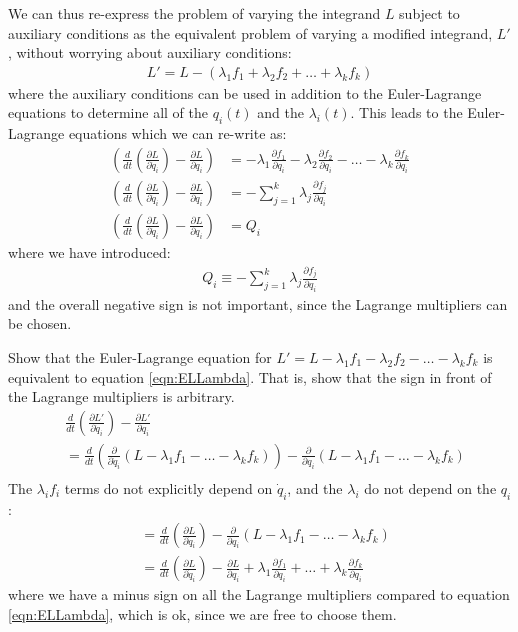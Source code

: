 We can thus re-express the problem of varying the integrand $L$ subject to auxiliary conditions as the equivalent problem of varying a modified integrand, $L'$, without worrying about auxiliary conditions:
\begin{align}
L'=L-(\lambda_1f_1+\lambda_2f_2+\dots +\lambda_kf_k)
\end{align}
where the auxiliary conditions can be used in addition to the Euler-Lagrange equations to determine all of the $q_i(t)$ and the $\lambda_i(t)$. This leads to the Euler-Lagrange equations which we can re-write as:
\begin{align}
\left(\frac{d}{dt}\left(\frac{\partial L}{\partial \dot{q}_i}\right)-\frac{\partial L}{\partial q_i}\right) &=-\lambda_1 \frac{\partial f_1}{\partial q_i}-\lambda_2\frac{\partial f_2}{\partial q_i} -\dots -\lambda_k \frac{\partial f_k}{\partial q_i}\nonumber\\
\left(\frac{d}{dt}\left(\frac{\partial L}{\partial \dot{q}_i}\right)-\frac{\partial L}{\partial q_i}\right) &=-\sum_{j=1}^k\lambda_j \frac{\partial f_j}{\partial q_i}\nonumber\\
\left(\frac{d}{dt}\left(\frac{\partial L}{\partial \dot{q}_i}\right)-\frac{\partial L}{\partial q_i}\right) &=Q_i
\label{eqn:ELLambdaQ}
\end{align}
where we have introduced:
\begin{align}
Q_i\equiv -\sum_{j=1}^k\lambda_j \frac{\partial f_j}{\partial q_i}
\end{align}
and the overall negative sign is not important, since the Lagrange multipliers can be chosen.


\begin{example}{0pt}{Show that the Euler-Lagrange equation for $L'=L-\lambda_1f_1-\lambda_2f_2-\dots -\lambda_kf_k$ is equivalent to equation \ref{eqn:ELLambda}. That is, show that the sign in front of the Lagrange multipliers is arbitrary.}{}
\begin{align*}
&\frac{d}{dt}\left(\frac{\partial L'}{\partial \dot{q}_i}\right)-\frac{\partial L'}{\partial q_i}\nonumber\\
&=\frac{d}{dt}\left(\frac{\partial}{\partial \dot{q}_i}(L-\lambda_1f_1-\dots -\lambda_kf_k)\right)-\frac{\partial}{\partial q_i}(L-\lambda_1f_1-\dots -\lambda_kf_k)\nonumber\\
\end{align*}
The $\lambda_if_i$ terms do not explicitly depend on $\dot{q}_i$, and the $\lambda_i$ do not depend on the $q_i$:
\begin{align*}
&=\frac{d}{dt}\left(\frac{\partial L}{\partial \dot{q}_i}\right)-\frac{\partial}{\partial q_i}(L-\lambda_1f_1-\dots -\lambda_kf_k)\nonumber\\
&=\frac{d}{dt}\left(\frac{\partial L}{\partial \dot{q}_i}\right)-\frac{\partial L}{\partial q_i}+\lambda_1\frac{\partial f_1}{\partial q_i}+\dots +\lambda_k\frac{\partial f_k}{\partial q_i}
\end{align*}
where we have a minus sign on all the Lagrange multipliers compared to equation \ref{eqn:ELLambda}, which is ok, since we are free to choose them.
\end{example}


